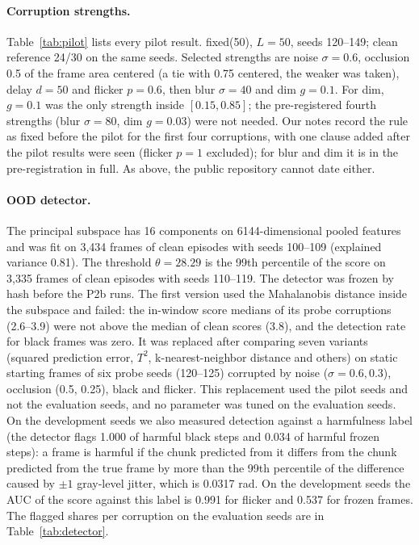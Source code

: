 \documentclass[11pt]{article}
\newcommand{\fixed}{\textsf{fixed}\xspace}
\begin{document}
\paragraph{Corruption strengths.} Table~\ref{tab:pilot} lists every pilot result. \fixed(50), $L{=}50$, seeds 120--149; clean reference 24/30 on the same seeds. Selected strengths are noise $\sigma{=}0.6$, occlusion 0.5 of the frame area centered (a tie with 0.75 centered, the weaker was taken), delay $d{=}50$ and flicker $p{=}0.6$, then blur $\sigma{=}40$ and dim $g{=}0.1$. For dim, $g{=}0.1$ was the only strength inside $[0.15,0.85]$; the pre-registered fourth strengths (blur $\sigma{=}80$, dim $g{=}0.03$) were not needed. Our notes record the rule as fixed before the pilot for the first four corruptions, with one clause added after the pilot results were seen (flicker $p{=}1$ excluded); for blur and dim it is in the pre-registration in full. As above, the public repository cannot date either.
\begin{table}[h]
\centering\small

\caption{Pilot for corruption strength. $R$: success of \fixed(50) divided by the clean success on the same seeds (30 episodes each).}
\label{tab:pilot}
\end{table}

\paragraph{OOD detector.} The principal subspace has 16 components on 6144-dimensional pooled features and was fit on 3,434 frames of clean episodes with seeds 100--109 (explained variance 0.81). The threshold $\theta=28.29$ is the 99th percentile of the score on 3,335 frames of clean episodes with seeds 110--119. The detector was frozen by hash before the P2b runs. The first version used the Mahalanobis distance inside the subspace and failed: the in-window score medians of its probe corruptions (2.6--3.9) were not above the median of clean scores (3.8), and the detection rate for black frames was zero. It was replaced after comparing seven variants (squared prediction error, $T^2$, k-nearest-neighbor distance and others) on static starting frames of six probe seeds (120--125) corrupted by noise ($\sigma=0.6,0.3$), occlusion (0.5, 0.25), black and flicker. This replacement used the pilot seeds and not the evaluation seeds, and no parameter was tuned on the evaluation seeds. On the development seeds we also measured detection against a harmfulness label (the detector flags 1.000 of harmful black steps and 0.034 of harmful frozen steps): a frame is harmful if the chunk predicted from it differs from the chunk predicted from the true frame by more than the 99th percentile of the difference caused by $\pm1$ gray-level jitter, which is 0.0317 rad. On the development seeds the AUC of the score against this label is 0.991 for flicker and 0.537 for frozen frames. The flagged shares per corruption on the evaluation seeds are in Table~\ref{tab:detector}.
\end{document}
